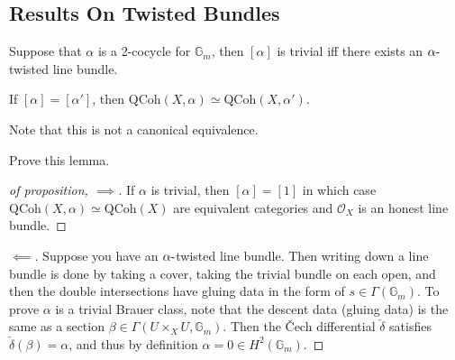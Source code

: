 \hypertarget{results-on-twisted-bundles}{%
\subsection{Results On Twisted
Bundles}\label{results-on-twisted-bundles}}

\begin{proposition}[?]

Suppose that \(\alpha\) is a 2-cocycle for \({\mathbb{G}}_{m}\), then
\([\alpha]\) is trivial iff there exists an \(\alpha{\hbox{-}}\)twisted
line bundle.

\end{proposition}

\begin{lemma}[?]

If \([\alpha] = [\alpha']\), then
\({\mathrm{QCoh}}(X,\alpha) \simeq {\mathrm{QCoh}}(X, \alpha')\).

\end{lemma}

Note that this is not a canonical equivalence.

\begin{exercise}[?]

Prove this lemma.

\end{exercise}

\begin{proof}[of proposition, $\implies$]

If \(\alpha\) is trivial, then \([\alpha] = [1]\) in which case
\({\mathrm{QCoh}}(X,\alpha) \simeq {\mathrm{QCoh}}(X)\) are equivalent
categories and \({\mathcal{O}}_{X}\) is an honest line bundle.

\end{proof}

\begin{proof}[$\impliedby$]

Suppose you have an \(\alpha{\hbox{-}}\)twisted line bundle. Then
writing down a line bundle is done by taking a cover, taking the trivial
bundle on each open, and then the double intersections have gluing data
in the form of \(s\in \Gamma({\mathbb{G}}_{m})\). To prove \(\alpha\) is
a trivial Brauer class, note that the descent data (gluing data) is the
same as a section \(\beta\in \Gamma(U \times_{X} U, {\mathbb{G}}_{m})\).
Then the Čech differential \(\check{\delta}\) satisfies
\(\check{\delta}(\beta)=\alpha\), and thus by definition
\(\alpha = 0 \in H^{2}({\mathbb{G}}_{m})\).

\end{proof}

